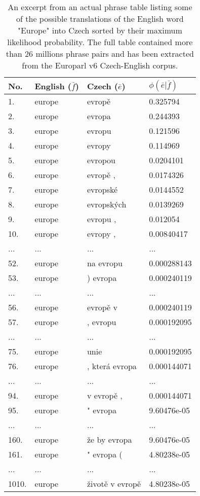 \begin{table}[ht]
\centering
\begin{tabular}{ l l l l }
No. & English ($\bar{f}$) & Czech ($\bar{e}$) & $\phi(\bar{e}|\bar{f})$ \\
\hline
\hline
1. & europe & evropě & 0.325794 \\
2. & europe & evropa & 0.244393 \\
3. & europe & evropu & 0.121596 \\
4. & europe & evropy & 0.114969 \\
5. & europe & evropou & 0.0204101 \\
6. & europe & evropě , & 0.0174326 \\
7. & europe & evropské & 0.0144552 \\
8. & europe & evropských & 0.0139269 \\
9. & europe & evropu , & 0.012054 \\
10. & europe & evropy , & 0.00840417 \\
... & ... & ... & ... \\
52. & europe & na evropu & 0.000288143 \\
53. & europe & ) evropa & 0.000240119 \\
... & ... & ... & ... \\
56. & europe & evropě v & 0.000240119 \\
57. & europe & , evropu & 0.000192095 \\
... & ... & ... & ... \\
75. & europe & unie & 0.000192095 \\
76. & europe & , která evropa & 0.000144071 \\
... & ... & ... & ... \\
94. & europe & v evropě , & 0.000144071 \\
95. & europe & " evropa & 9.60476e-05 \\
... & ... & ... & ... \\
160. & europe & že by evropa & 9.60476e-05 \\
161. & europe & " evropa ( & 4.80238e-05 \\
... & ... & ... & ... \\
1010. & europe & životě v evropě & 4.80238e-05 \\
\hline
\hline
\end{tabular}
\caption{\label{phrase-table-europarl}
An excerpt from an actual phrase table listing some of the possible translations of the English
word "Europe" into Czech sorted by their maximum likelihood probability.
The full table contained more than 26 millions phrase pairs and has been extracted
from the Europarl v6 Czech-English corpus.}
\end{table}

